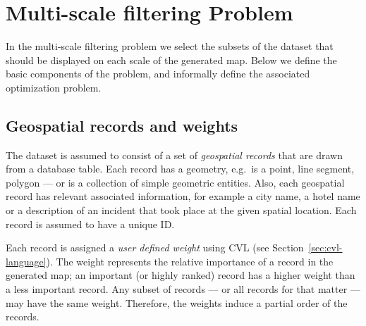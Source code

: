 \section{Multi-scale filtering Problem}
\label{sec:background}


In the multi-scale filtering problem we select the subsets of the dataset that should be displayed on each scale of the generated map. Below we define the basic components of the problem, and informally define the associated optimization problem. 

\subsection{Geospatial records and weights}
\label{sec:records}


The dataset is assumed to consist of a set of \emph{geospatial records} that are drawn from a database table. Each record has a geometry, e.g.\ is a point, line segment, polygon --- or is a collection of simple geometric entities. Also, each geospatial record has relevant associated information, for example a city name, a hotel name or a description of an incident that took place at the given spatial location. Each record is assumed to have a unique ID.

Each record is assigned a \emph{user defined weight} using CVL (see Section~\ref{sec:cvl-language}). The weight represents the relative importance of a record in the generated map; an important (or highly ranked) record has a higher weight than a less important record. Any subset of records --- or all records for that matter --- may have the same weight. Therefore, the weights induce a partial order of the records.




